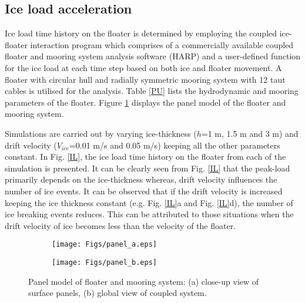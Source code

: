\documentclass[review]{elsarticle}
\begin{document}
\subsection{Ice load acceleration}
Ice load time history on the floater is determined by employing the coupled ice-floater interaction program which comprises of a commercially available coupled floater and mooring system analysis software (HARP) and a user-defined function for the ice load at each time step based on both ice and floater movement. A floater with circular hull and radially symmetric mooring system with 12 taut cables is utilised for the analysis. Table \ref{PU} lists the hydrodynamic and mooring parameters of the floater. Figure \ref{panel} displays the panel model of the floater and mooring system.

Simulations are carried out by varying ice-thickness ($h$=1 m, 1.5 m and 3 m) and drift velocity ($V_{ice}$=0.01 m/s and 0.05 m/s) keeping all the other parameters constant. In Fig. \ref{IL}, the ice load time history on the floater from each of the simulation is presented. It can be clearly seen from Fig. \ref{IL} that the peak-load primarily depends on the ice-thickness whereas, drift velocity influences the number of ice events. It can be observed that if the drift velocity is increased keeping the ice thickness constant (e.g. Fig. \ref{IL}a and Fig. \ref{IL}d), the number of ice breaking events reduces. This can be attributed to those situations when the drift velocity of ice becomes less than the velocity of the floater. 

\begin{figure}
	\centering
	\begin{subfigure}{.5\textwidth}
		\centering
		\texttt{[image: Figs/panel\_a.eps]}
		\caption{}
	\end{subfigure}%
	\begin{subfigure}{.5\textwidth}
		\centering
		\texttt{[image: Figs/panel\_b.eps]}
		\caption{}
	\end{subfigure}
	\caption{Panel model of floater and mooring system: (a) close-up view of surface panels, (b) global view of coupled system.}
	\label{panel}
\end{figure}
\end{document}
